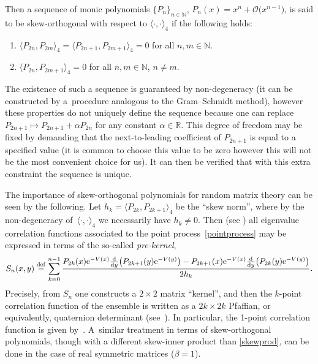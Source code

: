 \documentclass[pdftex]{sigma}
\numberwithin{equation}{section}
\begin{document}
Then a sequence of monic polynomials $\{ P_n \}_{n \in \mathbb{N}}$, $P_n(x) = x^n + \mathcal{O}\big(x^{n-1}\big)$, is said to be skew-orthogonal with respect to $\langle \cdot, \cdot \rangle_4$ if the following holds:
\begin{enumerate}\itemsep=0pt
\item[(1)] $\langle P_{2n}, P_{2m} \rangle_4 = \langle P_{2n+1}, P_{2m+1} \rangle_4 = 0$ for all $n,m \in \mathbb{N}$.
\item[(2)] $\langle P_{2n}, P_{2m+1} \rangle_4 = 0$ for all $n, m \in \mathbb{N}$, $n\neq m$.
\end{enumerate}
The existence of such a sequence is guaranteed by non-degeneracy (it can be constructed by a~procedure analogous to the Gram--Schmidt method), however these properties do not uniquely define the sequence because one can replace $P_{2n+1} \mapsto P_{2n+1} + \alpha P_{2n}$ for any constant $\alpha \in \mathbb{R}$. This degree of freedom may be fixed by demanding that the next-to-leading coefficient of $P_{2n+1}$ is equal to a specified value (it is common to choose this value to be zero however this will not be the most convenient choice for us). It can then be verified that with this extra constraint the sequence is unique.

The importance of skew-orthogonal polynomials for random matrix theory can be seen by the following. Let $h_k = \langle P_{2k}, P_{2k+1} \rangle_4$ be the \enquote{skew norm}, where by the non-degeneracy of~${\langle \cdot, \cdot \rangle_4}$ we necessarily have $h_k \neq 0$. Then (see \cite[Propositions~6.1.6 and 6.1.7]{loggases}) all eigenvalue correlation functions associated to the point process~\eqref{pointprocess} may be expressed in terms of the so-called \textit{pre-kernel},
\begin{equation}\label{prekernel}
S_n(x,y) \overset{\mathrm{def}}{=} \sum_{k=0}^{n-1} \frac{ P_{2k}(x) {\rm e}^{-V(x)} \frac{\rm d}{{\rm d}y}\big( P_{2k+1}(y) {\rm e}^{-V(y)} \big) - P_{2k+1}(x) {\rm e}^{-V(x)} \frac{\rm d}{{\rm d}y}\big( P_{2k}(y) {\rm e}^{-V(y)} \big)}{2 h_k}.
\end{equation}
Precisely, from $S_n$ one constructs a $2 \times 2$ matrix \enquote{kernel}, and then the $k$-point correlation function of the ensemble is written as a $2k \times 2k$ Pfaffian, or equivalently, quaternion determinant (see~\cite[Chapter 6]{loggases}). In particular, the 1-point correlation function is given by~. A~similar treatment in terms of skew-orthogonal polynomials, though with a different skew-inner product than \eqref{skewprod}, can be done in the case of real symmetric matrices ($\beta =1$).
\end{document}
